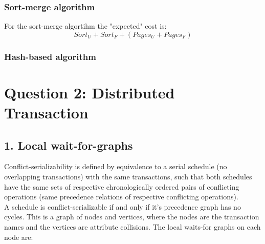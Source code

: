 \documentclass{article}      %
\begin{document}
\subsubsection* {Sort-merge algorithm}

For the sort-merge algortihm the "expected" cost is:
\begin{equation}
Sort_U + Sort_F + (Pages_U + Pages_F)
\end{equation}

\subsubsection* {Hash-based algorithm}

\section* {Question 2: Distributed Transaction}

\subsection* {1. Local wait-for-graphs}
Conflict-serializability is defined by equivalence to a serial schedule (no overlapping transactions) with the same transactions, such that both schedules have the same sets of respective chronologically ordered pairs of conflicting operations (same precedence relations of respective conflicting operations).\\

A schedule is conflict-serializable if and only if it's precedence graph has no cycles. This is a graph of nodes and vertices, where the nodes are the transaction names and the vertices are attribute collisions. The local waits-for graphs on each node are:\\
\end{document}
